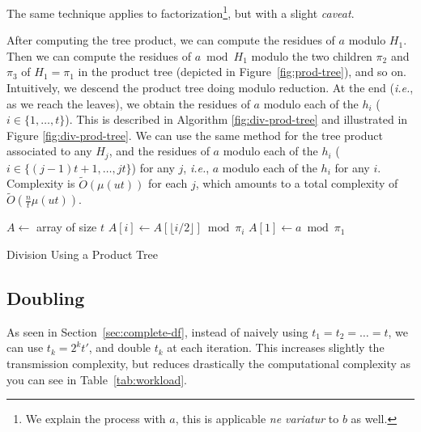 \documentclass[11pt]{llncs}
\newcommand{\Oapp}{\ensuremath{\tilde{O}}}
\newcommand{\ie}{\textit{i.e.}\xspace}
\newcommand{\comm}[1]{\marginpar{%
\vskip-\baselineskip %
\raggedright\footnotesize
\itshape\hrule\smallskip#1\par\smallskip\hrule}}
\begin{document}
\comm{What is the caveat?}
The same technique applies to factorization\footnote{We explain the process with $a$, this is applicable \textit{ne variatur} to $b$ as well.}, but with a slight \textit{caveat}.

After computing the tree product, we can compute the residues of $a$ modulo $H_1$.
Then we can compute the residues of $a \bmod{H_1}$ modulo the two children $\pi_2$ and $\pi_3$ of $H_1 = \pi_1$ in the product tree (depicted in Figure~\ref{fig:prod-tree}), and so on. Intuitively, we descend the product tree doing modulo reduction. At the end (\ie, as we reach the leaves), we obtain the residues of $a$ modulo each of the $h_i$ ($i \in \{1,\dots,t\}$). This is described in Algorithm \ref{fig:div-prod-tree} and illustrated in Figure \ref{fig:div-prod-tree}.
We can use the same method for the tree product associated to any $H_j$, and the residues of $a$ modulo each of the $h_i$ ($i \in \{(j-1)t+1,\dots,jt\}$) for any $j$, \ie, $a$ modulo each of the $h_i$ for any $i$. Complexity is $\Oapp(\mu(u t))$ for each $j$, which amounts to a total complexity of $\Oapp(\frac{n}{t} \mu(u t))$.

\begin{algorithm}
\newcommand{\vstart}{\ensuremath{\mathrm{start}}}
\newcommand{\vmid}{\ensuremath{\mathrm{mid}}}
\newcommand{\vend}{\ensuremath{\mathrm{end}}}
\begin{algorithmic}[1]
\State $A \gets $ array of size $t$
    \State $A[i] \gets A[\lfloor i/2 \rfloor] \bmod \pi_i$
    \State {}
    \State {}
  \EndIf
\EndFunction
\State $A[1] \gets a \bmod \pi_1$
\State {}
\State {}
\end{algorithmic}
\caption{Division Using a Product Tree}\label{alg:div-prod-tree}
\end{algorithm}

\subsection{Doubling}
\label{sec:doubling}

As seen in Section~\ref{sec:complete-df}, instead of naively using $t_1 = t_2 = \dots = t$, we can use $t_k = 2^k t'$, and double $t_k$ at each iteration.
This increases slightly the transmission complexity, but reduces drastically the computational complexity as you can see in Table~\ref{tab:workload}.
\end{document}
